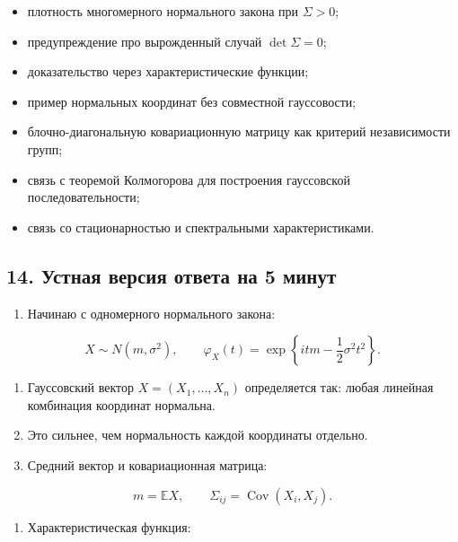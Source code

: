 \documentclass[
  11pt,
  a4paper,
]{article}
\providecommand{\tightlist}{%
  \setlength{\itemsep}{0pt}\setlength{\parskip}{0pt}}
\begin{document}
\begin{itemize}
\tightlist
\item
  плотность многомерного нормального закона при \(\Sigma>0\);
\item
  предупреждение про вырожденный случай \(\det\Sigma=0\);
\item
  доказательство через характеристические функции;
\item
  пример нормальных координат без совместной гауссовости;
\item
  блочно-диагональную ковариационную матрицу как критерий независимости
  групп;
\item
  связь с теоремой Колмогорова для построения гауссовской
  последовательности;
\item
  связь со стационарностью и спектральными характеристиками.
\end{itemize}

\subsection{14. Устная версия ответа на 5
минут}\label{ux443ux441ux442ux43dux430ux44f-ux432ux435ux440ux441ux438ux44f-ux43eux442ux432ux435ux442ux430-ux43dux430-5-ux43cux438ux43dux443ux442}

\begin{enumerate}
\def\labelenumi{\arabic{enumi}.}
\tightlist
\item
  Начинаю с одномерного нормального закона:
\end{enumerate}

\[
X\sim N(m,\sigma^2),
\qquad
\varphi_X(t)=\exp\left\{itm-\frac12\sigma^2t^2\right\}.
\]

\begin{enumerate}
\def\labelenumi{\arabic{enumi}.}
\setcounter{enumi}{1}
\tightlist
\item
  Гауссовский вектор \(X=(X_1,\ldots,X_n)\) определяется так: любая
  линейная комбинация координат нормальна.
\item
  Это сильнее, чем нормальность каждой координаты отдельно.
\item
  Средний вектор и ковариационная матрица:
\end{enumerate}

\[
m=\mathbb EX,
\qquad
\Sigma_{ij}=\operatorname{Cov}(X_i,X_j).
\]

\begin{enumerate}
\def\labelenumi{\arabic{enumi}.}
\setcounter{enumi}{4}
\tightlist
\item
  Характеристическая функция:
\end{enumerate}
\end{document}
